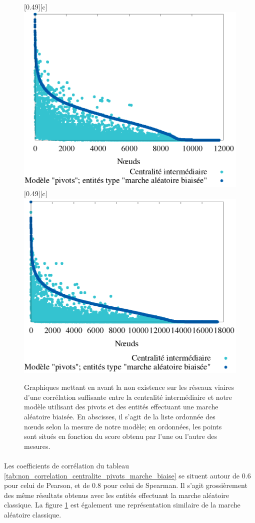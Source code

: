 \documentclass[a4paper, 10pt]{report}
\begin{document}
\begin{figure}[htbp]
	\centering
	[0.49\linewidth][c]{
		\includegraphics[width=0.49\linewidth]{./img/pivots_marche_aleatoire_biaise_le_havre.png}
	}
	\hfill
	[0.49\linewidth][c]{
		\includegraphics[width=0.49\linewidth]{./img/pivots_marche_aleatoire_biaise_rouen.png}
	}
	\caption{Graphiques mettant en avant la non existence sur les réseaux viaires d'une corrélation suffisante entre la centralité intermédiaire et notre modèle utilisant des pivots et des entités effectuant une marche aléatoire biaisée. En abscisses, il s'agit de la liste ordonnée des n\oe uds selon la mesure de notre modèle; en ordonnées, les points sont situés en fonction du score obtenu par l'une ou l'autre des mesures.}
	\label{fig:non_correlation_centralite_pivots_marche_biaise}
\end{figure}

\paragraph{}Les coefficients de corrélation du tableau \ref{tab:non_correlation_centralite_pivots_marche_biaise} se situent autour de 0.6 pour celui de Pearson, et de 0.8 pour celui de Spearman. Il s'agit grossièrement des même résultats obtenus avec les entités effectuant la marche aléatoire classique. La figure \ref{fig:non_correlation_centralite_pivots_marche_biaise} est également une représentation similaire de la marche aléatoire classique.
\end{document}
